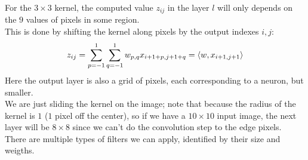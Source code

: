 \documentclass[12pt]{article}
\begin{document}
For the $3 \times 3$ kernel, the computed 
value $z_{ij}$ in the layer $l$
will only depends on the $9$ values of pixels
in some region. \\
This is done by shifting the kernel along pixels
by the output indexes $i, j$:
\[ z_{ij} = \sum_{p=-1}^1\sum_{q=-1}^1 w_{p,q}
x_{i+1+p, j+1+q} = \left\langle w, x_{i+1, j+1} \right\rangle \]
Here the output layer is also a grid of pixels,
each corresponding to a neuron,
but smaller. \\
We are just sliding the kernel on the image;
note that because the radius of the kernel
is $1$ ($1$ pixel off the center),
so if we have a $10 \times 10$ input image,
the next layer will be $8 \times 8$
since we can't do the convolution step
to the edge pixels. \\

There are multiple types of filters we can
apply, identified by their size and weigths. \\
\end{document}
